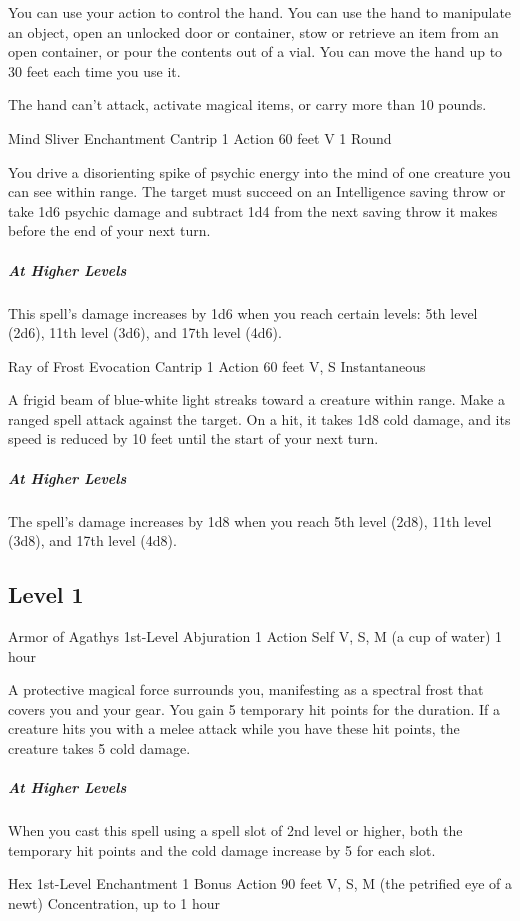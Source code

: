 {You can use your action to control the hand. You can use the hand to manipulate an object, open an unlocked door or container, stow or retrieve an item from an open container, or pour the contents out of a vial. You can move the hand up to 30 feet each time you use it.

The hand can't attack, activate magical items, or carry more than 10 pounds.

\DndSpellHeader
	{Mind Sliver}
	{Enchantment Cantrip}
	{1 Action}
	{60 feet}
	{V}
	{1 Round}

You drive a disorienting spike of psychic energy into the mind of one creature you can see within range. The target must succeed on an Intelligence saving throw or take 1d6 psychic damage and subtract 1d4 from the next saving throw it makes before the end of your next turn.

\subparagraph*{At Higher Levels} This spell’s damage increases by 1d6 when you reach certain levels: 5th level (2d6), 11th level (3d6), and 17th level (4d6).

\DndSpellHeader
	{Ray of Frost}
	{Evocation Cantrip}
	{1 Action}
	{60 feet}
	{V, S}
	{Instantaneous}

A frigid beam of blue-white light streaks toward a creature within range. Make a ranged spell attack against the target. On a hit, it takes 1d8 cold damage, and its speed is reduced by 10 feet until the start of your next turn.

\subparagraph*{At Higher Levels} The spell’s damage increases by 1d8 when you reach 5th level (2d8), 11th level (3d8), and 17th level (4d8).

\subsection*{Level 1}

\DndSpellHeader
	{Armor of Agathys}
	{1st-Level Abjuration}
	{1 Action}
	{Self}
	{V, S, M (a cup of water)}
	{1 hour}

A protective magical force surrounds you, manifesting as a spectral frost that covers you and your gear. You gain 5 temporary hit points for the duration. If a creature hits you with a melee attack while you have these hit points, the creature takes 5 cold damage.

\subparagraph*{At Higher Levels} When you cast this spell using a spell slot of 2nd level or higher, both the temporary hit points and the cold damage increase by 5 for each slot.

\DndSpellHeader
	{Hex}
	{1st-Level Enchantment}
	{1 Bonus Action}
	{90 feet}
	{V, S, M (the petrified eye of a newt)}
	{Concentration, up to 1 hour}

}
